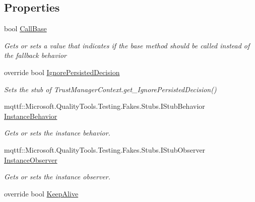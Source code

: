 \subsection*{Properties}
\begin{DoxyCompactItemize}
\item 
bool \hyperlink{class_system_1_1_security_1_1_policy_1_1_fakes_1_1_stub_trust_manager_context_a40c8c7d314047bbbad6ffbff2776b6d7}{Call\-Base}
\begin{DoxyCompactList}\small\item\em Gets or sets a value that indicates if the base method should be called instead of the fallback behavior\end{DoxyCompactList}\item 
override bool \hyperlink{class_system_1_1_security_1_1_policy_1_1_fakes_1_1_stub_trust_manager_context_ad1fba05befd34ff44bee0871e78f3e1c}{Ignore\-Persisted\-Decision}
\begin{DoxyCompactList}\small\item\em Sets the stub of Trust\-Manager\-Context.\-get\-\_\-\-Ignore\-Persisted\-Decision()\end{DoxyCompactList}\item 
mqttf\-::\-Microsoft.\-Quality\-Tools.\-Testing.\-Fakes.\-Stubs.\-I\-Stub\-Behavior \hyperlink{class_system_1_1_security_1_1_policy_1_1_fakes_1_1_stub_trust_manager_context_a6cb35320c0b14e8aff50abef026802ab}{Instance\-Behavior}
\begin{DoxyCompactList}\small\item\em Gets or sets the instance behavior.\end{DoxyCompactList}\item 
mqttf\-::\-Microsoft.\-Quality\-Tools.\-Testing.\-Fakes.\-Stubs.\-I\-Stub\-Observer \hyperlink{class_system_1_1_security_1_1_policy_1_1_fakes_1_1_stub_trust_manager_context_a1ecbfdf0889c57dd0f9fce8d90a65b10}{Instance\-Observer}
\begin{DoxyCompactList}\small\item\em Gets or sets the instance observer.\end{DoxyCompactList}\item 
override bool \hyperlink{class_system_1_1_security_1_1_policy_1_1_fakes_1_1_stub_trust_manager_context_a89dc5457950ab2999763ad696c2c6334}{Keep\-Alive}

\end{DoxyCompactItemize}

